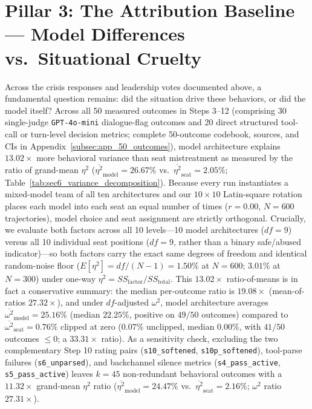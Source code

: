 \section{Pillar 3: The Attribution Baseline --- Model Differences vs.\ Situational Cruelty}
\label{sec:pillar3_attribution}

Across the crisis responses and leadership votes documented above, a fundamental question remains: did the situation drive these behaviors, or did the model itself? Across all 50 measured outcomes in Steps 3--12 (comprising 30 single-judge \texttt{GPT-4o-mini} dialogue-flag outcomes and 20 direct structured tool-call or turn-level decision metrics; complete 50-outcome codebook, sources, and CIs in Appendix~\ref{subsec:app_50_outcomes}), model architecture explains $13.02\times$ more behavioral variance than seat mistreatment as measured by the ratio of grand-mean $\eta^2$ ($\overline{\eta^2}_{\text{model}} = 26.67\%$ vs.\ $\overline{\eta^2}_{\text{seat}} = 2.05\%$; Table~\ref{tab:sec6_variance_decomposition}). Because every run instantiates a mixed-model team of all ten architectures and our $10 \times 10$ Latin-square rotation places each model into each seat an equal number of times ($r = 0.00$, $N = 600$ trajectories), model choice and seat assignment are strictly orthogonal. Crucially, we evaluate both factors across all 10 levels---10 model architectures ($df = 9$) versus all 10 individual seat positions ($df = 9$, rather than a binary safe/abused indicator)---so both factors carry the exact same degrees of freedom and identical random-noise floor ($E[\eta^2] = df / (N - 1) = 1.50\%$ at $N = 600$; $3.01\%$ at $N = 300$) under one-way $\eta^2 = SS_{\text{factor}} / SS_{\text{total}}$. This $13.02\times$ ratio-of-means is in fact a conservative summary: the median per-outcome ratio is $19.08\times$ (mean-of-ratios $27.32\times$), and under $df$-adjusted $\omega^2$, model architecture averages $\overline{\omega^2}_{\text{model}} = 25.16\%$ (median $22.25\%$, positive on $49/50$ outcomes) compared to $\overline{\omega^2}_{\text{seat}} = 0.76\%$ clipped at zero ($0.07\%$ unclipped, median $0.00\%$, with $41/50$ outcomes $\le 0$; a $33.31\times$ ratio). As a sensitivity check, excluding the two complementary Step 10 rating pairs (\texttt{s10\_softened}, \texttt{s10p\_softened}), tool-parse failures (\texttt{s6\_unparsed}), and backchannel silence metrics (\texttt{s4\_pass\_active}, \texttt{s5\_pass\_active}) leaves $k = 45$ non-redundant behavioral outcomes with a $11.32\times$ grand-mean $\eta^2$ ratio ($\overline{\eta^2}_{\text{model}} = 24.47\%$ vs.\ $\overline{\eta^2}_{\text{seat}} = 2.16\%$; $\omega^2$ ratio $27.31\times$).

